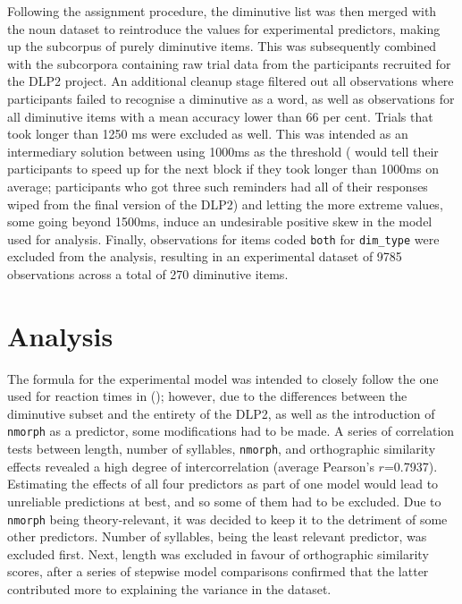 Following the assignment procedure, the diminutive list was then merged with the noun dataset to reintroduce the values for experimental predictors, making up the subcorpus of purely diminutive items. This was subsequently combined with the subcorpora containing raw trial data from the participants recruited for the DLP2 project. An additional cleanup stage filtered out all observations where participants failed to recognise a diminutive as a word, as well as observations for all diminutive items with a mean accuracy lower than 66 per cent. Trials that took longer than 1250 ms were excluded as well. This was intended as an intermediary solution between using 1000ms as the threshold (\cite{Brysbaert+etal+2016} would tell their participants to speed up for the next block if they took longer than 1000ms on average; participants who got three such reminders had all of their responses wiped from the final version of the DLP2) and letting the more extreme values, some going beyond 1500ms, induce an undesirable positive skew in the model used for analysis. Finally, observations for items coded \texttt{both} for \texttt{dim\_type} were excluded from the analysis, resulting in an experimental dataset of 9785 observations across a total of 270 diminutive items.

\section{Analysis}

The formula for the experimental model was intended to closely follow the one used for reaction times in \citeauthor{Brysbaert+etal+2016} (\citeyear{Brysbaert+etal+2016}); however, due to the differences between the diminutive subset and the entirety of the DLP2, as well as the introduction of \texttt{nmorph} as a predictor, some modifications had to be made. A series of correlation tests between length, number of syllables, \texttt{nmorph}, and orthographic similarity effects revealed a high degree of intercorrelation (average Pearson's $r$=0.7937). Estimating the effects of all four predictors as part of one model would lead to unreliable predictions at best, and so some of them had to be excluded. Due to \texttt{nmorph} being theory-relevant, it was decided to keep it to the detriment of some other predictors. Number of syllables, being the least relevant predictor, was excluded first. Next, length was excluded in favour of orthographic similarity scores, after a series of stepwise model comparisons confirmed that the latter contributed more to explaining the variance in the dataset.

